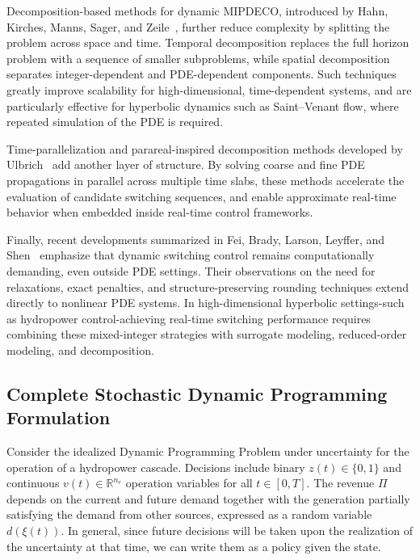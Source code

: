 \documentclass{article}
\newcommand{\1}{\mathds{1}}          %
\theoremstyle{definition}
\begin{document}
\begin{sloppypar}
Decomposition-based methods for dynamic MIPDECO, introduced by Hahn, Kirches, Manns, Sager,
and Zeile~\cite{hahn2021decomposition}, further reduce complexity by splitting the problem
across space and time. Temporal decomposition replaces the full horizon problem with a
sequence of smaller subproblems, while spatial decomposition separates integer-dependent and
PDE-dependent components. Such techniques greatly improve scalability for high-dimensional,
time-dependent systems, and are particularly effective for hyperbolic dynamics such as
Saint--Venant flow, where repeated simulation of the PDE is required.

Time-parallelization and parareal-inspired decomposition methods developed by Ulbrich~\cite{ulbrich2007generalized} add another layer of structure. By solving coarse and
fine PDE propagations in parallel across multiple time slabs, these methods accelerate the
evaluation of candidate switching sequences, and enable approximate real-time behavior when
embedded inside real-time control frameworks.

Finally, recent developments summarized in Fei, Brady, Larson, Leyffer, and Shen~\cite{fei2023binary} emphasize that dynamic switching control remains computationally demanding, even outside PDE settings. Their observations on the need for relaxations, exact penalties, and structure-preserving rounding techniques extend directly to nonlinear PDE systems. In high-dimensional hyperbolic settings-such as hydropower control-achieving real-time switching performance requires combining these mixed-integer strategies with
surrogate modeling, reduced-order modeling, and decomposition.

\subsection{Complete Stochastic Dynamic Programming Formulation}


Consider the idealized Dynamic Programming Problem under uncertainty for the
operation of a hydropower cascade. Decisions include binary $z(t)\in \{0,1\}$ and continuous $v(t)\in\mathbb{R}^{n_v}$ operation variables for all $t\in [0,T]$. The revenue $\Pi$ depends on the current and future demand together with the generation partially satisfying the demand from other sources, expressed as a random variable $d(\xi(t))$. In general, since future decisions will be taken upon the realization of the uncertainty at that time, we can write them as a policy given the state. 


\end{sloppypar}
\end{document}
